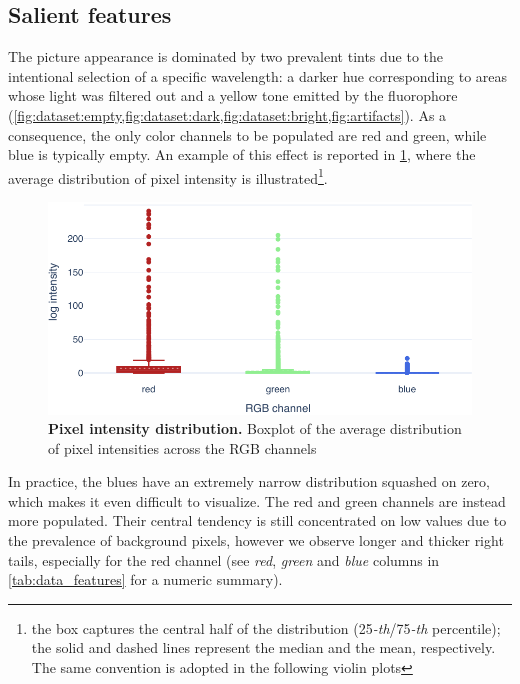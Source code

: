 \subsection{Salient features}
\label{sec:data_features}

The picture appearance is dominated by two prevalent tints due to the intentional selection of a specific wavelength: a darker hue corresponding to areas whose light was filtered out and a yellow tone emitted by the fluorophore
(\cref{fig:dataset:empty,fig:dataset:dark,fig:dataset:bright,fig:artifacts}).
As a consequence, the only color channels to be populated are red and green, while blue is typically empty. 
An example of this effect is reported in \cref{fig:dataset:pixel_intensity}, where the average distribution of pixel intensity is illustrated\footnote{the box captures the central half of the distribution (25\emph{-th}/75\emph{-th} percentile); the solid and dashed lines represent the median and the mean, respectively. The same convention is adopted in the following violin plots}.
\begin{figure}
    \centering
    \includegraphics[width=\textwidth]{figures/120_dataset/features/pixel_intensity_distribution.pdf}
    \caption{\textbf{Pixel intensity distribution.} Boxplot of the average distribution of pixel intensities across the  RGB channels}
    \label{fig:dataset:pixel_intensity}
\end{figure}
In practice, the blues have an extremely narrow distribution squashed on zero, which makes it even difficult to visualize. %
The red and green channels are instead more populated. Their central tendency is still concentrated on low values due to the prevalence of background pixels, however we observe longer and thicker right tails, especially for the red channel (see \textit{red}, \textit{green} and \textit{blue} columns in \cref{tab:data_features} for a numeric summary).
